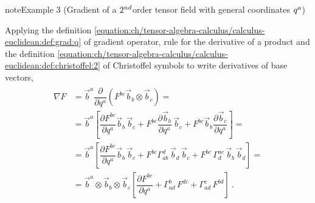 \documentclass[letterpaper,10pt,english]{jupyterBook}
\begin{document}
\begin{sphinxadmonition}{note}{Example 3 (Gradient of a \protect\(2^{nd}\protect\)\sphinxhyphen{}order tensor field \sphinxhyphen{} with general coordinates \protect\(q^{a}\protect\))}



\sphinxAtStartPar
Applying the definition \eqref{equation:ch/tensor-algebra-calculus/calculus-euclidean:def:grad:q} of gradient operator, rule for the derivative of a product and the definition \eqref{equation:ch/tensor-algebra-calculus/calculus-euclidean:def:christoffel:2} of Christoffel symbols to write derivatives of base vectors,
\begin{equation*}
\begin{split}\begin{aligned}
  \nabla F 
  & = \vec{b}^a \dfrac{\partial}{\partial q^a} \left( F^{bc} \vec{b}_b \otimes \vec{b}_c \right) = \\
  & = \vec{b}^a \left[ \dfrac{\partial F^{bc}}{\partial q^a} \vec{b}_b \, \vec{b}_c + F^{bc} \dfrac{\partial \vec{b}_b}{\partial q^a} \, \vec{b}_c + F^{bc} \vec{b}_b \dfrac{\partial \vec{b}_c}{\partial q^a} \right] = \\
  & = \vec{b}^a \left[ \dfrac{\partial F^{bc}}{\partial q^a} \vec{b}_b \, \vec{b}_c + F^{bc} \Gamma_{ab}^d \, \vec{b}_d \, \vec{b}_c + F^{bc} \, \Gamma_{d}^{ac} \, \vec{b}_b \, \vec{b}_d \right] = \\
  & = \vec{b}^a \otimes \vec{b}_b \otimes \vec{b}_c \left[ \dfrac{\partial F^{bc}}{\partial q^a} + \Gamma_{ad}^b \, F^{dc} + \Gamma^{c}_{ad} \, F^{bd}  \right] \ .
\end{aligned}\end{split}
\end{equation*}\end{sphinxadmonition}
\end{document}
